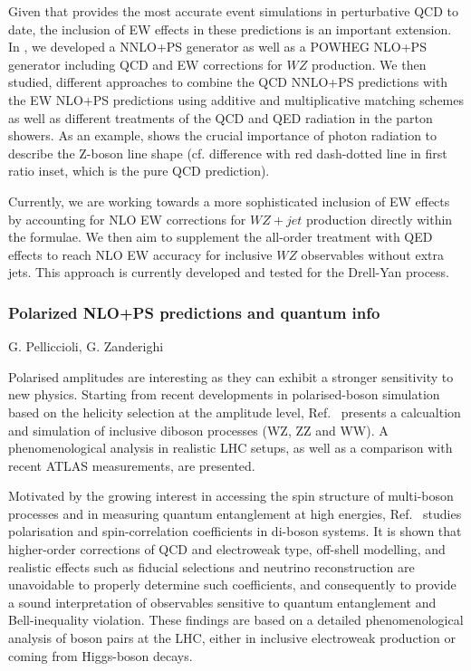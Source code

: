 \documentclass{FBR_Bericht_2025}
\begin{document}
\begin{refsection}
Given that \minnlo{} provides the most accurate event simulations in 
perturbative QCD to date, the inclusion of EW effects in these predictions
is an important extension. In , we developed a \minnlo{} NNLO+PS generator 
as well as a POWHEG NLO+PS  generator including QCD and EW corrections 
for $WZ$ production. We then studied, different approaches to combine the
QCD NNLO+PS predictions with the EW NLO+PS predictions using additive 
and multiplicative matching schemes as well as different treatments of the 
QCD and QED radiation in the parton showers.
As an example,  shows the crucial importance of photon radiation
to describe the Z-boson line shape (cf. difference with 
red dash-dotted line in first ratio inset, which is the pure QCD prediction).

Currently, we are working towards a more sophisticated inclusion of EW effects 
by accounting for NLO EW corrections for $WZ+jet$ production
directly within the \minnlo{} formulae. We then aim to supplement the all-order treatment 
with QED effects to reach NLO EW accuracy for inclusive $WZ$ observables without
extra jets. This approach is currently developed and tested for the Drell-Yan process.


\subsubsection{Polarized NLO+PS predictions and quantum info}
\begin{Namen}
G. Pelliccioli, G. Zanderighi
\end{Namen}
%

Polarised amplitudes are interesting as they can exhibit a stronger
sensitivity to new physics.
%
Starting from recent developments in polarised-boson simulation based
on the helicity selection at the amplitude level,
Ref.~\cite{Pelliccioli:2023zpd} presents a calcualtion and simulation
of inclusive diboson processes (WZ, ZZ and WW). A phenomenological
analysis in realistic LHC setups, as well as a comparison with recent
ATLAS measurements, are presented.

Motivated by the growing interest in accessing the spin structure of
multi-boson processes and in measuring quantum entanglement at high
energies, Ref.~\cite{Grossi:2024jae} studies polarisation and
spin-correlation coefficients in di-boson systems. It is shown that
higher-order corrections of QCD and electroweak type, off-shell
modelling, and realistic effects such as fiducial selections and
neutrino reconstruction are unavoidable to properly determine such
coefficients, and consequently to provide a sound interpretation of
observables sensitive to quantum entanglement and Bell-inequality
violation. These findings are based on a detailed phenomenological
analysis of boson pairs at the LHC, either in inclusive electroweak
production or coming from Higgs-boson decays.

\printbibliography[heading=subbibliography]
\end{refsection}
\end{document}
